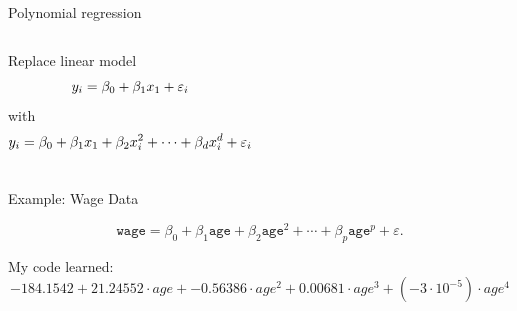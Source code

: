\documentclass[aspectratio=169,usenames,dvipsnames]{beamer}
\newcommand{\InstructorList}[1]{
\begin{itemize}
	\color{orange}
	#1
\end{itemize}
}
\renewcommand{\InstructorList}[1]{}
\begin{document}
\begin{frame}[c]{Polynomial regression}

\begin{columns}
\centering
Replace linear model
\begin{equation*}
	y_i = \beta_0 + \beta_1x_1 + \varepsilon_i
\end{equation*}
with
\begin{equation*}
	y_i = \beta_0 + \beta_1x_1 + \beta_2x_i^2 + \cdots + \beta_dx_i^d + \varepsilon_i
\end{equation*}

\centering
\InstructorList{
  \item Can learn with linear models by passing in predictors $x_i^\ell$
	\item Tend to not go higher than degree 3 or 4 because makes overly flexible
}

\end{columns}

\end{frame}
\begin{frame}[t]{Example: Wage Data}

	$$
\texttt{wage} = \beta_0 + \beta_1 \texttt{age} + \beta_2 \texttt{age}^2 + \cdots + \beta_p \texttt{age}^p +\varepsilon.
$$

   My code learned:
  $$
  -184.1542 + 21.24552 \cdot age + -0.56386 \cdot age^2 + 0.00681 \cdot age^3 + (-3\cdot 10^{-5}) \cdot age^4
  $$

\begin{columns}
\centering

\InstructorList{
	\item Make a matrix of predictors $X$ with columns $X^0, X^1, X^2, \cdots, X^p$
	\item Then can use linear regression to learn the coefficients
}
	
\centering
\InstructorList{
  \item Plot of wage vs age for men in central Atlantic region of the US
  \item Equivalent figure from the book on the next page
}
\end{columns}

\end{frame}
\end{document}
